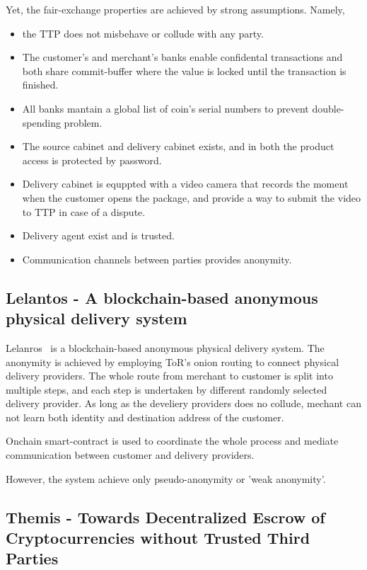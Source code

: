 \documentclass{article}
\begin{document}
Yet, the fair-exchange properties are achieved by strong assumptions. Namely,
\begin{itemize}
\item the TTP does not misbehave or collude with any party.
\item The customer's and merchant's banks enable confidental transactions and both share commit-buffer where the value is locked until the transaction is finished.
\item All banks mantain a global list of coin's serial numbers to prevent double-spending problem.
\item The source cabinet and delivery cabinet exists, and in both the product access is protected by password.
\item Delivery cabinet is equppted with a video camera that records the moment when the customer opens the package, and provide a way to submit the video to TTP in case of a dispute.
\item Delivery agent exist and is trusted.
\item Communication channels between parties provides anonymity.
\end{itemize}

\subsection{Lelantos - A blockchain-based anonymous physical delivery system}

Lelanros~\cite{altawy2017lelantos} is a blockchain-based anonymous physical delivery system. The anonymity is achieved by employing ToR's onion routing to connect physical delivery providers. The whole route from merchant to customer is split into multiple steps, and each step is undertaken by different randomly selected delivery provider. As long as the develiery providers does no collude, mechant can not learn both identity and destination address of the customer.


Onchain smart-contract is used to coordinate the whole process and mediate communication between customer and delivery providers.


However, the system achieve only pseudo-anonymity or 'weak anonymity'. 

\subsection{Themis - Towards Decentralized Escrow of Cryptocurrencies without Trusted Third Parties}
\end{document}
